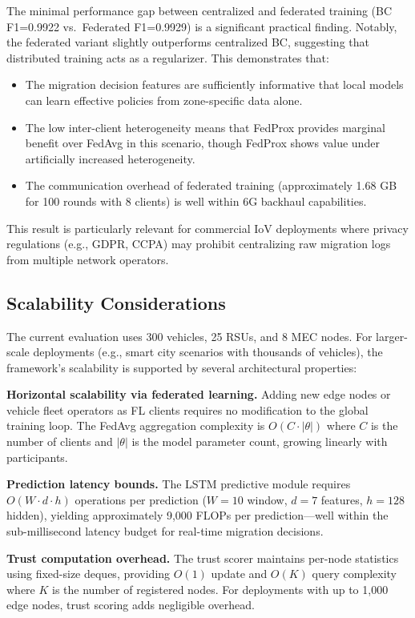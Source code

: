 \documentclass[journal,twoside]{IEEEtran}
\begin{document}
The minimal performance gap between centralized and federated training (BC F1=0.9922 vs.\ Federated F1=0.9929) is a significant practical finding. Notably, the federated variant slightly outperforms centralized BC, suggesting that distributed training acts as a regularizer. This demonstrates that:
\begin{itemize}
    \item The migration decision features are sufficiently informative that local models can learn effective policies from zone-specific data alone.
    \item The low inter-client heterogeneity means that FedProx provides marginal benefit over FedAvg in this scenario, though FedProx shows value under artificially increased heterogeneity.
    \item The communication overhead of federated training (approximately 1.68 GB for 100 rounds with 8 clients) is well within 6G backhaul capabilities.
\end{itemize}

This result is particularly relevant for commercial IoV deployments where privacy regulations (e.g., GDPR, CCPA) may prohibit centralizing raw migration logs from multiple network operators.

\subsection{Scalability Considerations}

The current evaluation uses 300 vehicles, 25 RSUs, and 8 MEC nodes. For larger-scale deployments (e.g., smart city scenarios with thousands of vehicles), the framework's scalability is supported by several architectural properties:

\textbf{Horizontal scalability via federated learning.} Adding new edge nodes or vehicle fleet operators as FL clients requires no modification to the global training loop. The FedAvg aggregation complexity is $O(C \cdot |\theta|)$ where $C$ is the number of clients and $|\theta|$ is the model parameter count, growing linearly with participants.

\textbf{Prediction latency bounds.} The LSTM predictive module requires $O(W \cdot d \cdot h)$ operations per prediction ($W{=}10$ window, $d{=}7$ features, $h{=}128$ hidden), yielding approximately 9,000 FLOPs per prediction---well within the sub-millisecond latency budget for real-time migration decisions.

\textbf{Trust computation overhead.} The trust scorer maintains per-node statistics using fixed-size deques, providing $O(1)$ update and $O(K)$ query complexity where $K$ is the number of registered nodes. For deployments with up to 1,000 edge nodes, trust scoring adds negligible overhead.
\end{document}

